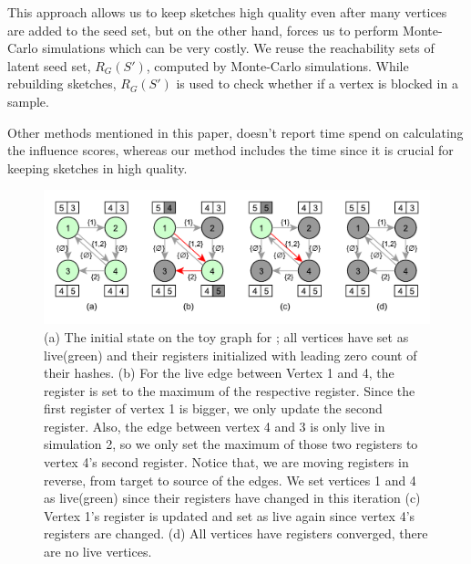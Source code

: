 \documentclass[10pt,journal,compsoc]{IEEEtran}
\newcommand\acro{{\sc{HyperFuseR\xspace}\xspace}\xspace}
\begin{document}
This approach allows us to keep sketches high quality even after many vertices are added to the seed set, 
but on the other hand, forces us to perform Monte-Carlo simulations which can be very costly. We reuse the reachability sets of latent seed set, $R_G(S')$, computed by Monte-Carlo simulations. While rebuilding sketches, $R_G(S')$ is used to check whether if a vertex is blocked in a sample.

Other methods mentioned in this paper, doesn't report time spend on calculating the influence scores, 
whereas our method includes the time since it is crucial for keeping sketches in high quality.


\begin{figure}[!ht]
\begin{center}
\includegraphics[width=\linewidth]{images/sketch-diffusion.pdf}
\caption{(a) The initial state on the toy graph for \acro{}; all vertices have set as live(green) and their registers initialized with leading zero count of their hashes. (b) 
For the live edge between Vertex 1 and 4, the register is set to the maximum of the respective register. Since the first register of vertex 1 is bigger, we only update the second register. Also, the edge between vertex 4 and 3 is only live in simulation 2, so we only set the maximum of those two registers to vertex 4's second register. Notice that, we are moving registers in reverse, from target to source of the edges. We set vertices 1 and 4 as live(green) since their registers have changed in this iteration (c) Vertex 1's register is updated and set as live again since vertex 4's registers are changed.  (d) All vertices have registers converged, there are no live vertices. }\label{fig:hf-processing} 
\end{center}
\end{figure}
\end{document}

